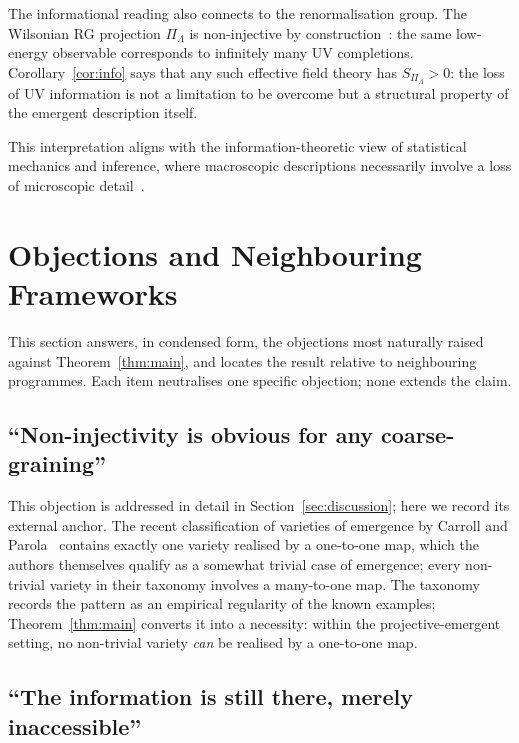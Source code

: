\documentclass[12pt,a4paper]{article}
\begin{document}
  The informational reading also connects to the renormalisation group.
  The Wilsonian RG projection $\Pi_\Lambda$ is non-injective by construction~\citep{Wilson1975}:
  the same low-energy observable corresponds to infinitely many UV completions.
  Corollary~\ref{cor:info} says that any such effective field theory has
  $S_{\Pi_\Lambda} > 0$: the loss of UV information is
  not a limitation to be overcome but a structural property of the emergent
  description itself.

  This interpretation aligns with the information-theoretic view of
  statistical mechanics and inference, where macroscopic descriptions
  necessarily involve a loss of microscopic detail~\citep{Jaynes1957}.

  \section{Objections and Neighbouring Frameworks}
  \label{sec:objections}

  This section answers, in condensed form, the objections most naturally raised against
  Theorem~\ref{thm:main}, and locates the result relative to neighbouring programmes.
  Each item neutralises one specific objection; none extends the claim.

  \subsection*{``Non-injectivity is obvious for any coarse-graining''}

    This objection is addressed in detail in Section~\ref{sec:discussion}; here we record its external anchor.
    The recent classification of varieties of emergence by Carroll and Parola~\citep{CarrollParola2024} contains
    exactly one variety realised by a one-to-one map, which the authors themselves qualify as a somewhat trivial
    case of emergence; every non-trivial variety in their taxonomy involves a many-to-one map.
    The taxonomy records the pattern as an empirical regularity of the known examples; Theorem~\ref{thm:main}
    converts it into a necessity: within the projective-emergent setting, no non-trivial variety \emph{can} be
    realised by a one-to-one map.

  \subsection*{``The information is still there, merely inaccessible''}
\end{document}
